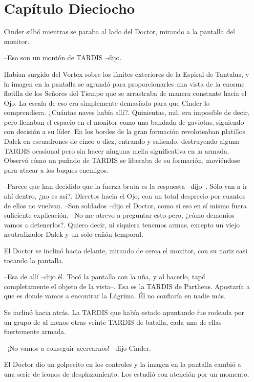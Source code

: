 \chapter*{Capítulo Dieciocho}

Cinder silbó mientras se paraba al lado del Doctor, mirando a la pantalla del monitor. 

--Eso son un montón de TARDIS --dijo.

Habían surgido del Vortex sobre los límites exteriores de la Espiral de Tantalus, y la imagen en la pantalla se agrandó para proporcionarles una vista de la enorme flotilla de los Señores del Tiempo que se arrastraba de manera constante hacia el Ojo.
La escala de eso era simplemente demasiado para que Cinder lo comprendiera. ¿Cuántas naves había allí?. Quinientas, mil, era imposible de decir, pero llenaban el espacio en el monitor como una bandada de gaviotas, siguiendo con decisión a su líder.
En los bordes de la gran formación revoloteaban platillos Dalek en escuadrones de cinco o diez, entrando y saliendo, destruyendo alguna TARDIS ocasional pero sin hacer ninguna mella significativa en la armada. Observó cómo un puñado de TARDIS se liberaba de su formación, moviéndose para atacar a los buques enemigos.

--Parece que han decidido que la fuerza bruta es la respuesta --dijo--. Sólo van a ir ahí dentro, ¿no es así?. Directos hacia el Ojo, con un total desprecio por cuantos de ellos no vuelvan.
--Son soldados --dijo el Doctor, como si eso en sí mismo fuera suficiente explicación.
--No me atrevo a preguntar esto pero, ¿cómo demonios vamos a detenerlos?. Quiero decir, ni siquiera tenemos armas, excepto un viejo neutralizador Dalek y un solo cañón temporal.

El Doctor se inclinó hacia delante, mirando de cerca el monitor, con su nariz casi tocando la pantalla. 

--Esa de allí --dijo él. Tocó la pantalla con la uña, y al hacerlo, tapó completamente el objeto de la vista--. Esa es la TARDIS de Partheus. Apostaría a que es donde vamos a encontrar la Lágrima. Él no confiaría en nadie más.

Se inclinó hacia atrás. La TARDIS que había estado apuntando fue rodeada por un grupo de al menos otras veinte TARDIS de batalla, cada una de ellas fuertemente armada. 

--¡No vamos a conseguir acercarnos! --dijo Cinder.

El Doctor dio un golpecito en los controles y la imagen en la pantalla cambió a una serie de iconos de desplazamiento. Los estudió con atención por un momento. 

